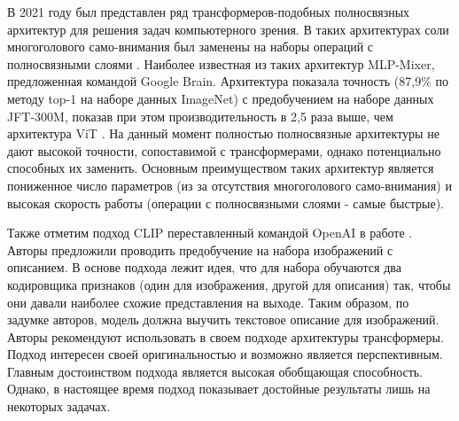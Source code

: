 \documentclass[12pt]{article}
\begin{document}
\begin{sloppypar}
В 2021 году был представлен ряд трансформеров-подобных полносвязных архитектур для решения задач компьютерного зрения. В таких архитектурах соли многоголового само-внимания был заменены на наборы операций с полносвязными слоями \cite{guo2021can}. Наиболее известная из таких архитектур MLP-Mixer, предложенная командой Google Brain. Архитектура показала точность (87,9\% по методу top-1 на наборе данных ImageNet) с предобучением на наборе данных JFT-300M, показав при этом производительность в 2,5 раза выше, чем архитектура ViT \cite{tolstikhin2021mlp}.  На данный момент полностью полносвязные архитектуры не дают высокой точности, сопоставимой с трансформерами, однако потенциально способных их заменить. Основным преимуществом таких архитектур является пониженное число параметров (из за отсутствия многоголового само-внимания) и высокая скорость работы (операции с полносвязными слоями - самые быстрые).

Также отметим подход CLIP переставленный командой OpenAI в работе \cite{radford2021learning}. Авторы предложили проводить предобучение на набора изображений с описанием. В основе подхода лежит идея, что для набора обучаются два кодировщика признаков (один для изображения, другой для описания) так, чтобы они давали наиболее схожие представления на выходе. Таким образом, по задумке авторов, модель должна выучить текстовое описание для изображений. Авторы рекомендуют использовать в своем подходе архитектуры трансформеры. Подход интересен своей оригинальностью и возможно является перспективным. Главным достоинством подхода является высокая обобщающая способность. Однако, в настоящее время подход показывает достойные результаты лишь на некоторых задачах. 



\end{sloppypar}
\end{document}
